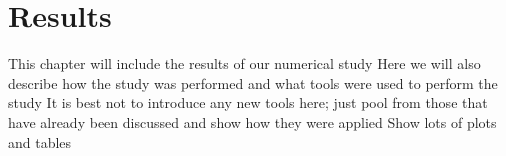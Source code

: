 \chapter{Results}
\label{ch:results}
This chapter will include the results of our numerical study
Here we will also describe how the study was performed and what tools were used to perform the study
It is best not to introduce any new tools here; just pool from those that have already been discussed and show how they were applied
Show lots of plots and tables